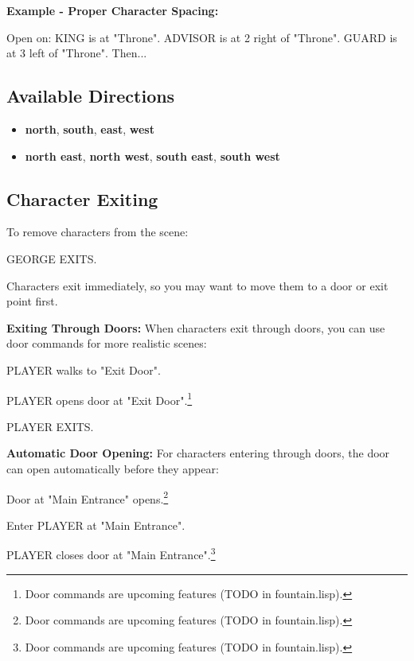 \documentclass[11pt,letterpaper,oldstylefigures]{memoir}
\newcommand{\stagedir}[1]{#1\par\vspace{1\baselineskip}}
\newenvironment{FountainExample}
  {\begingroup
  \ttfamily\small
   \setlength{\parindent}{0pt}
  \setlength{\parskip}{0.5em}
  \allowdisplaybreaks
  \setlength{\displaywidowpenalty}{0}
  \setlength{\widowpenalty}{0}
  \setlength{\clubpenalty}{0}
  \setlength{\interlinepenalty}{0}
}
  {\endgroup}
\newcommand{\paragraphbreak}{\vspace{0.5em}}
\newcommand{\fountain}[1]{\textbf{#1}}
\begin{document}
\textbf{Example - Proper Character Spacing:}
\begin{FountainExample}
\stagedir{Open on: KING is at "Throne". ADVISOR is at 2 right of "Throne". GUARD is at 3 left of "Throne". Then...}
\end{FountainExample}

\subsection{Available Directions}
\paragraphbreak

\begin{itemize}
\item \fountain{north}, \fountain{south}, \fountain{east}, \fountain{west}
\item \fountain{north east}, \fountain{north west}, \fountain{south east}, \fountain{south west}
\end{itemize}

\subsection{Character Exiting}
\paragraphbreak

To remove characters from the scene:

\begin{FountainExample}
\stagedir{GEORGE EXITS.}
\end{FountainExample}

Characters exit immediately, so you may want to move them to a door or exit point first.

\textbf{Exiting Through Doors:}
When characters exit through doors, you can use door commands for more realistic scenes:

\begin{FountainExample}
\stagedir{PLAYER walks to "Exit Door".}
\stagedir{PLAYER opens door at "Exit Door".\footnote{Door commands are upcoming features (TODO in fountain.lisp).}}
\stagedir{PLAYER EXITS.}
\end{FountainExample}

\textbf{Automatic Door Opening:}
For characters entering through doors, the door can open automatically before they appear:

\begin{FountainExample}
\stagedir{Door at "Main Entrance" opens.\footnote{Door commands are upcoming features (TODO in fountain.lisp).}}
\stagedir{Enter PLAYER at "Main Entrance".}
\stagedir{PLAYER closes door at "Main Entrance".\footnote{Door commands are upcoming features (TODO in fountain.lisp).}}
\end{FountainExample}
\end{document}
